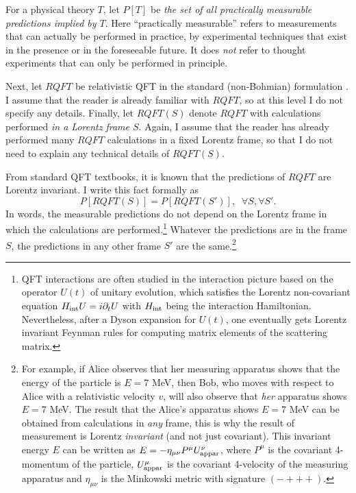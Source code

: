 \documentclass[12pt]{article}
\begin{document}
For a physical theory $T$, let 
$P[T]$ be {\em the set of all practically measurable predictions implied by $T$}. 
Here ``practically measurable'' refers to measurements that can actually be 
performed in practice, by experimental techniques that exist in the presence or in the foreseeable future.
It does {\em not} refer to thought experiments that can only be performed in principle. 

Next, let $RQFT$ be relativistic QFT in the standard (non-Bohmian) formulation \cite{bd2,ryder,chengli,schwartz}.
I assume that the reader is already familiar with $RQFT$, so at this level I do not specify
any details. Finally, let 
$RQFT(S)$ denote $RQFT$ with calculations performed {\em in a Lorentz frame $S$}.
Again, I assume that the reader has already performed many $RQFT$ calculations
in a fixed Lorentz frame, so that I do not need to explain any technical details 
of $RQFT(S)$.

From standard QFT textbooks, it is known that the predictions of $RQFT$ are Lorentz invariant.
I write this fact formally as
\begin{equation}\label{lorinv}
 P[RQFT(S)]=P[RQFT(S')], \;\; \forall S,\forall S' .
\end{equation}
In words, the measurable predictions do not depend on the Lorentz frame in which
the calculations are performed.\footnote{QFT interactions are often studied 
in the interaction picture \cite{bd2} based on the operator $U(t)$ of unitary evolution, which satisfies
the Lorentz non-covariant equation $H_{\rm int}U=i\partial_tU$ with $H_{\rm int}$
being the interaction Hamiltonian. Nevertheless, after a Dyson expansion for $U(t)$,
one eventually gets Lorentz invariant Feynman rules for computing matrix elements of the scattering matrix.} 
Whatever the predictions are in the frame $S$, 
the predictions in any other frame $S'$ are the same.\footnote{For example, if Alice 
observes that her measuring apparatus shows 
that the energy of the particle is $E=7$ MeV, then Bob, who moves with respect 
to Alice with a relativistic velocity $v$, will also observe that {\em her} apparatus shows $E=7$ MeV.
The result that the Alice's apparatus shows $E=7$ MeV
can be obtained from calculations in {\em any} frame, this is why the result of measurement is Lorentz {\em invariant}
(and not just covariant). This invariant energy $E$ can be written as $E=-\eta_{\mu\nu}P^{\mu}U^{\nu}_{\rm appar}$,
where $P^{\mu}$ is the covariant 4-momentum of the particle, $U^{\mu}_{\rm appar}$ is the
covariant 4-velocity of the measuring apparatus and   
$\eta_{\mu\nu}$ is the Minkowski metric with signature $(-+++)$.}
\end{document}
